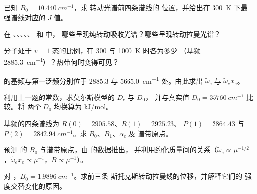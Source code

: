 \begin{exercise}[$\star$]\label{exo:b3:rovibrational-spectroscopy:2}
已知 $B_0 = \qty{10.440}{cm^{-1}}$，求  转动光谱前四条谱线的
位置，并给出在
\qty{300}{K} 下最强谱线对应的 $J$ 值。
\end{exercise}

\begin{exercise}[$\star$]\label{exo:b3:rovibrational-spectroscopy:3}
在 、、、、、 和  中，
哪些呈现纯转动吸收光谱？哪些呈现转动拉曼光谱？
\end{exercise}

\begin{exercise}[$\star$]\label{exo:b3:rovibrational-spectroscopy:4}
 分子处于 $v = 1$ 态的比例，在 300 与 \qty{1000}{K} 时各为多少
（基频 \qty{2885.3}{cm^{-1}}）？热带何时变得可见？
\end{exercise}

\begin{exercise}[$\star\star$]\label{exo:b3:rovibrational-spectroscopy:5}
 的基频与第一泛频分别位于 2885.3 与
\qty{5665.0}{cm^{-1}} 处。由此求出 $\tilde\omega_e$ 与 $\tilde\omega_ex_e$。
\end{exercise}

\begin{exercise}[$\star\star$]\label{exo:b3:rovibrational-spectroscopy:6}
利用上一题的常数，求莫尔斯模型的 $D_e$ 与 $D_0$，
并与真实值 $D_0 = \qty{35760}{cm^{-1}}$ 比较。将
两个 $D_0$ 均换算为 \unit{kJ/mol}。
\end{exercise}

\begin{exercise}[$\star\star$]\label{exo:b3:rovibrational-spectroscopy:7}
 基频的四条谱线为 $R(0) = 2905.58$、$R(1) = 2925.23$、
$P(1) = 2864.43$ 与 $P(2) = \qty{2842.94}{cm^{-1}}$。求 $B_0$、$B_1$、$\alpha_e$ 及
谱带原点。
\end{exercise}

\begin{exercise}[$\star\star$]\label{exo:b3:rovibrational-spectroscopy:8}
预测  的 $B_0$ 与谱带原点，由  的数据推出，
并利用约化质量间的关系（$\tilde\omega_e \propto \mu^{-1/2}$，$\tilde\omega_ex_e \propto
\mu^{-1}$，$B \propto \mu^{-1}$）。
\end{exercise}

\begin{exercise}[$\star\star$]\label{exo:b3:rovibrational-spectroscopy:9}
对 ，$B_0 = \qty{1.9896}{cm^{-1}}$。求前三条
斯托克斯转动拉曼线的位移，并解释它们的
强度交替变化的原因。
\end{exercise}

